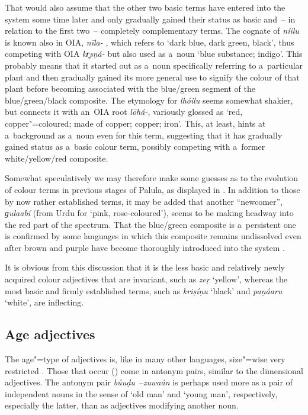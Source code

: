 That would also assume that the other two basic terms have entered into the system some time later
and only gradually gained their status as basic and~-- in relation to the first two~-- completely
complementary terms. The cognate of \textit{níilu} is known also in OIA, \textit{nīla-}
\citep[7563]{turner1966}, which refers to `dark blue, dark green, black', thus competing with OIA
\textit{kr̥ṣṇá-} but also used as a~noun `blue substance; indigo'. This probably means that it
started out as a~noun specifically referring to a~particular plant and then gradually gained its
more general use to signify the colour of that plant before becoming associated with the blue/green
segment of the blue/green/black composite. The etymology for \textit{lhóilu} seems somewhat shakier,
but \citet[11168, 11158]{turner1966} connects it with an~OIA root \textit{lōhá-}, variously glossed
as `red, copper"=coloured; made of copper; copper; iron'. This, at least, hints at a~background as
a~noun even for this term, suggesting that it has gradually gained status as a~basic colour term,
possibly competing with a~former white/yellow/red composite.



Somewhat speculatively we may therefore make some guesses as to the evolution of colour terms in previous stages of Palula, as displayed in . In addition to those by now rather established terms, it may be added that another ``newcomer'', \textit{ɡulaabí} (from Urdu for `pink, rose-coloured'), seems to be making headway into the red part of the spectrum. That the blue/green composite is a~persistent one is confirmed by some languages in which this composite remains undissolved even after brown and purple have become thoroughly introduced into the system \citep[18]{kayetal1991}.



It is obvious from this discussion that it is the less basic and relatively newly acquired colour adjectives that are invariant, such as \textit{zeṛ} `yellow', whereas the most basic and firmly established terms, such as \textit{kriṣíṇu} `black' and \textit{paṇáaru} `white', are inflecting. 


\subsection{Age adjectives}
\label{subsec:6-2-3}


The age"=type of adjectives is, like in many other languages, size"=wise very restricted \citep[46]{dixon1982}. Those that occur () come in antonym pairs, similar to the dimensional adjectives. The antonym pair \textit{búuḍu}~--\textit{zuwaán} is perhaps used more as a pair of independent nouns in the sense of `old man' and `young man', respectively, especially the latter, than as adjectives modifying another noun. 


